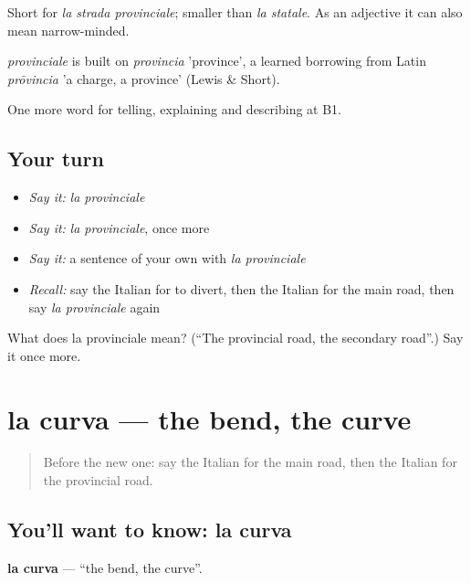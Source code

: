 Short for \emph{la strada provinciale}; smaller than \emph{la statale}. As an adjective it can also mean narrow-minded.

\begin{cousinweb}
\emph{provinciale} is built on \emph{provincia} 'province', a learned borrowing from Latin \emph{prōvincia} 'a charge, a province' (Lewis \& Short).
\end{cousinweb}

\begin{grammarlens}[title={What you've built}]
One more word for telling, explaining and describing at B1.
\end{grammarlens}

\subsection*{Your turn}
\begin{itemize}
\raggedright
  \item \emph{Say it:} \emph{la provinciale}
  \item \emph{Say it:} \emph{la provinciale}, once more
  \item \emph{Say it:} a sentence of your own with \emph{la provinciale}
  \item \emph{Recall:} say the Italian for to divert, then the Italian for the main road, then say \emph{la provinciale} again
\end{itemize}

\begin{tcolorbox}[breakable,colback=teal!4,colframe=teal!35!black,title={Before you move on}]
What does la provinciale mean? (\textquotedblleft{}The provincial road, the secondary road\textquotedblright{}.) Say it once more.
\end{tcolorbox}
\section[la curva]{la curva — the bend, the curve}

\label{lesson:IT-C414-curva}



\begin{quote}
Before the new one: say the Italian for the main road, then the Italian for the provincial road.
\end{quote}

\subsection*{You'll want to know: la curva}
\textbf{la curva} — \textquotedblleft{}the bend, the curve\textquotedblright{}.

